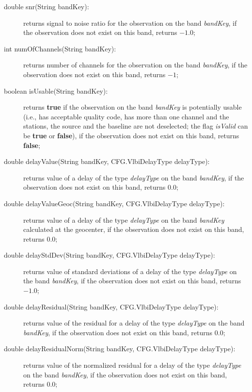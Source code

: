 \documentclass [10pt,letterpaper]{report}
\begin{document}
{{\begin{description}
\item[double snr(String bandKey):] returns signal to noise ratio
    for the observation on the band {\sl bandKey}, if the observation does not exist on
    this band, returns $-1.0$;

\item[int numOfChannels(String bandKey):] returns number of channels
    for the observation on the band {\sl bandKey}, if the observation does not exist on
    this band, returns $-1$;

\item[boolean isUsable(String bandKey):] returns {\bf true} if the observation
    on the band {\sl bandKey} is potentially usable (i.e., has acceptable quality code,
    has more than one channel and the stations, the source and the baseline are not
    deselected; the flag {\sl isValid} can be {\bf true} or {\bf false}),
    if the observation does not exist on this band, returns {\bf false};

\item[double delayValue(String bandKey, CFG.VlbiDelayType delayType):] returns
    value of a delay of the type {\sl delayType} on the band {\sl bandKey},
    if the observation does not exist on this band, returns $0.0$;

\item[double delayValueGeoc(String bandKey, CFG.VlbiDelayType delayType):] returns
    value of a delay of the type {\sl delayType} on the band {\sl bandKey} calculated at the
    geocenter, if the observation does not exist on this band, returns $0.0$;

\item[double delayStdDev(String bandKey, CFG.VlbiDelayType delayType):] returns
    value of standard deviations of a delay of the type {\sl delayType} on the band {\sl bandKey},
    if the observation does not exist on this band, returns $-1.0$;

\item[double delayResidual(String bandKey, CFG.VlbiDelayType delayType):] returns
    value of the residual for a delay of the type {\sl delayType} on the band {\sl bandKey},
    if the observation does not exist on this band, returns $0.0$;

\item[double delayResidualNorm(String bandKey, CFG.VlbiDelayType delayType):] returns
    value of the normalized residual for a delay of the type {\sl delayType} on the band
    {\sl bandKey}, if the observation does not exist on this band, returns $0.0$;


\end{description}}}
\end{document}
